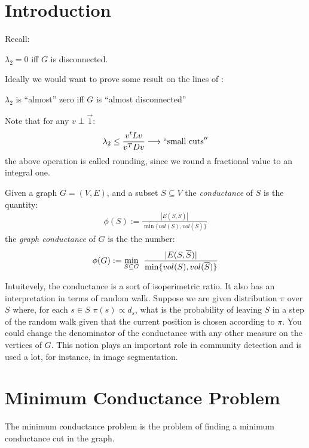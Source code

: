 \documentclass[11pt]{article}
\begin{document}

\section*{Introduction}
Recall: 
\begin{lemma}
$\lambda_2 = 0$ iff $G$ is disconnected.
\end{lemma}
Ideally we would want to prove some result on the lines of :
\begin{lemma}
$\lambda_2$ is ``almost'' zero iff $G$ is ``almost disconnected''
\end{lemma}

Note that for any $v\perp \vec{1}$:
\begin{align*}
    \lambda_2 \leq \frac{v^tLv}{v^TDv} \longrightarrow ``\text{small cuts}''
\end{align*}
the above operation is called rounding, since we round a fractional value to an integral one.

\begin{definition}
Given a graph $G=(V,E)$, and a subset $S \subseteq V$ the \emph{conductance} of $S$ is the quantity:
\begin{align*}
    \phi(S):= \frac{|E(S,\overline{S})|}{\min\{vol(S),vol(\overline{S})\}}
\end{align*}
the \emph{graph conductance} of $G$ is the the number:
\begin{align*}
    \phi(G):= \underset{S \subseteq G}{\min}\hspace{2mm} \frac{|E(S,\overline{S})|}{\min\{vol(S),vol(\overline{S})\}}
\end{align*}
\end{definition}
Intuitevely, the conductance is a sort of isoperimetric ratio. It also has an interpretation in terms of random walk. Suppose we are given distribution $\pi$ over $S$ where, for each $s \in S$ $\pi(s) \propto d_s$, what is the probability of leaving $S$ in a step of the random walk given that the current position is chosen according to $\pi$. You could change the denominator of the conductance with any other measure on the vertices of $G$. This notion plays an important role in community detection and is used a lot, for instance, in image segmentation.

\section*{Minimum Conductance Problem}
The minimum conductance problem is the problem of finding a minimum conductance cut in the graph.\\
\end{document}
